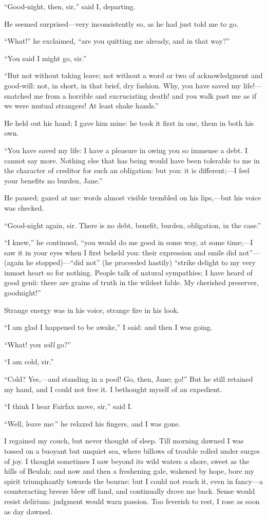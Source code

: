 \enquote{Good-night, then, sir,} said I, departing.

He seemed surprised---very inconsistently so, as he had just told me to
go.

\enquote{What!} he exclaimed, \enquote{are you quitting me already, and
in that way?}

\enquote{You said I might go, sir.}

\enquote{But not without taking leave; not without a word or two of
acknowledgment and good-will: not, in short, in that brief, dry
fashion. Why, you have saved my life!---snatched me from a horrible and
excruciating death! and you walk past me as if we were mutual
strangers! At least shake hands.}

He held out his hand; I gave him mine: he took it first in one, them in
both his own.

\enquote{You have saved my life: I have a pleasure in owing you so
immense a debt. I cannot say more. Nothing else that has being would
have been tolerable to me in the character of creditor for such an
obligation: but you: it is different;---I feel your benefits no burden,
Jane.}

He paused; gazed at me: words almost visible trembled on his lips,---but
his voice was checked.

\enquote{Good-night again, sir. There is no debt, benefit, burden,
obligation, in the case.}

\enquote{I knew,} he continued, \enquote{you would do me good in some
way, at some time;---I saw it in your eyes when I first beheld you:
their expression and smile did not}---(again he stopped)---\enquote{did
not} (he proceeded hastily) \enquote{strike delight to my very inmost
heart so for nothing. People talk of natural sympathies; I have heard
of good genii: there are grains of truth in the wildest fable. My
cherished preserver, goodnight!}

Strange energy was in his voice, strange fire in his look.

\enquote{I am glad I happened to be awake,} I said: and then I was
going.

\enquote{What! you \emph{will} go?}

\enquote{I am cold, sir.}

\enquote{Cold? Yes,---and standing in a pool! Go, then, Jane; go!} 
But he still retained my hand, and I could not free it. I bethought
myself of an expedient.

\enquote{I think I hear \Mrs{} Fairfax move, sir,} said I\@.

\enquote{Well, leave me:} he relaxed his fingers, and I was gone.

I regained my couch, but never thought of sleep. Till morning dawned I
was tossed on a buoyant but unquiet sea, where billows of trouble rolled
under surges of joy. I thought sometimes I saw beyond its wild waters a
shore, sweet as the hills of Beulah; and now and then a freshening gale,
wakened by hope, bore my spirit triumphantly towards the bourne: but I
could not reach it, even in fancy---a counteracting breeze blew off
land, and continually drove me back. Sense would resist delirium:
judgment would warn passion. Too feverish to rest, I rose as soon as
day dawned.
